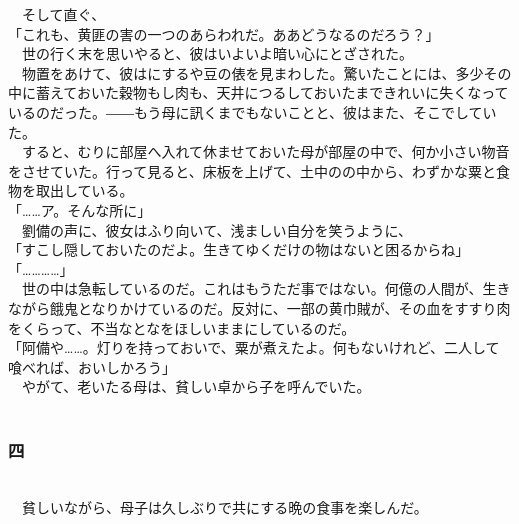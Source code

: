 \documentclass[
  paper=a5,
  fontsize=10pt,
  jafontsize=9.5pt,
  tate,                  %
  open_bracket_pos=nibu, %
]{jlreq}
\begin{document}
　そして直ぐ、\\


「これも、黄匪の害の一つのあらわれだ。ああどうなるのだろう？」\\


　世の行く末を思いやると、彼はいよいよ暗い心にとざされた。\\


　物置をあけて、彼はにするや豆の俵を見まわした。驚いたことには、多少その中に蓄えておいた穀物もし肉も、天井につるしておいたまできれいに失くなっているのだった。――もう母に訊くまでもないことと、彼はまた、そこでしていた。\\


　すると、むりに部屋へ入れて休ませておいた母が部屋の中で、何か小さい物音をさせていた。行って見ると、床板を上げて、土中のの中から、わずかな粟と食物を取出している。\\


「……ア。そんな所に」\\


　劉備の声に、彼女はふり向いて、浅ましい自分を笑うように、\\


「すこし隠しておいたのだよ。生きてゆくだけの物はないと困るからね」\\


「…………」\\


　世の中は急転しているのだ。これはもうただ事ではない。何億の人間が、生きながら餓鬼となりかけているのだ。反対に、一部の黄巾賊が、その血をすすり肉をくらって、不当なとなをほしいままにしているのだ。\\


「阿備や……。灯りを持っておいで、粟が煮えたよ。何もないけれど、二人して喰べれば、おいしかろう」\\


　やがて、老いたる母は、貧しい卓から子を呼んでいた。\\

\\

\subsubsection{四}

\\


　貧しいながら、母子は久しぶりで共にする晩の食事を楽しんだ。\\
\end{document}
